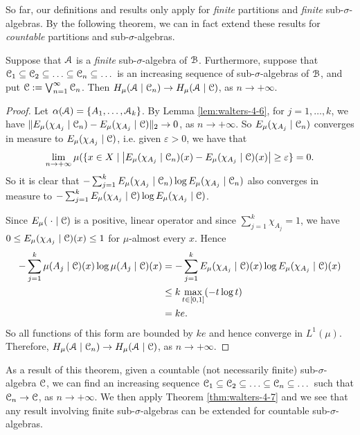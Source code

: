 So far, our definitions and results only apply for \emph{finite} partitions and \emph{finite} sub-$\sigma$-algebras. By the following theorem, we can in fact extend these results for \emph{countable} partitions and sub-$\sigma$-algebras.

\begin{theorem} \label{thm:walters-4-7}
	Suppose that $\mathcal{A}$ is a \emph{finite} sub-$\sigma$-algebra of $\mathcal{B}$. Furthermore, suppose that $\C_1 \subset \C_2 \subset \dots \subset \C_n \subset \dots$ is an increasing sequence of sub-$\sigma$-algebras of $\mathcal{B}$, and put $\mathcal{C}:= \bigvee_{n = 1}^\infty{\mathcal{C}_n}$. Then $H_\mu(\mathcal{A} \mid \mathcal{C}_n) \to H_\mu(\mathcal{A} \mid \mathcal{C})$, as $n \to +\infty$.
	\begin{proof}
		Let $\alpha(\mathcal{A}) = \{A_1, \dots, \mathcal{A}_k\}$. By Lemma \ref{lem:walters-4-6}, for $j = 1, \dots, k$, we have $\|E_\mu(\chi_{A_j} \mid \mathcal{C}_n) - E_\mu(\chi_{A_j} \mid \mathcal{C})\|_2 \to 0$, as $n \to +\infty$. So $E_\mu(\chi_{A_j} \mid \mathcal{C}_n)$ converges in measure to $E_\mu(\chi_{A_j} \mid \mathcal{C})$, i.e. given $\varepsilon > 0$, we have that
		\[
			\lim_{n \to +\infty}{\mu(\{x \in X \mid \left|E_\mu(\chi_{A_j} \mid \mathcal{C}_n)(x) - E_\mu(\chi_{A_j} \mid \mathcal{C})(x)\right| \geq \varepsilon\}} = 0.
		\]
		So it is clear that $-\sum_{j = 1}^k{E_\mu(\chi_{A_j} \mid \mathcal{C}_n) \log{E_\mu(\chi_{A_j} \mid \mathcal{C}_n)}}$ also converges in measure to $-\sum_{j = 1}^k{E_\mu(\chi_{A_j} \mid \mathcal{C}) \log{E_\mu(\chi_{A_j} \mid \mathcal{C})}}$.
		
		Since $E_\mu(\mathrel{}\cdot\mathrel{} \mid \mathcal{C})$ is a positive, linear operator and since $\sum_{j = 1}^k{\chi_{A_j}} = 1$, we have $0 \leq E_\mu(\chi_{A_j} \mid \mathcal{C})(x) \leq 1$ for $\mu$-almost every $x$. Hence
		\begin{align*}
			-\sum_{j = 1}^k{\mu(A_j \mid \mathcal{C})(x) \log{\mu(A_j \mid \mathcal{C})(x)}} &= -\sum_{j = 1}^k{E_\mu(\chi_{A_j} \mid \mathcal{C})(x) \log{E_\mu(\chi_{A_j} \mid \mathcal{C})(x)}} \\
				&\leq k \max_{t \in [0, 1]}(-t \log{t}) \\
				&= ke.
		\end{align*}
		So all functions of this form are bounded by $ke$ and hence converge in $L^1(\mu)$. Therefore, $H_\mu(\mathcal{A} \mid \mathcal{C}_n) \to H_\mu(\mathcal{A} \mid \mathcal{C})$, as $n \to +\infty$.
	\end{proof}
\end{theorem}

As a result of this theorem, given a countable (not necessarily finite) sub-$\sigma$-algebra $\mathcal{C}$, we can find an increasing sequence $\C_1 \subset \C_2 \subset \dots \subset \C_n \subset \dots$ such that $\mathcal{C}_n \to \mathcal{C}$, as $n \to +\infty$. We then apply Theorem \ref{thm:walters-4-7} and we see that any result involving finite sub-$\sigma$-algebras can be extended for countable sub-$\sigma$-algebras.

